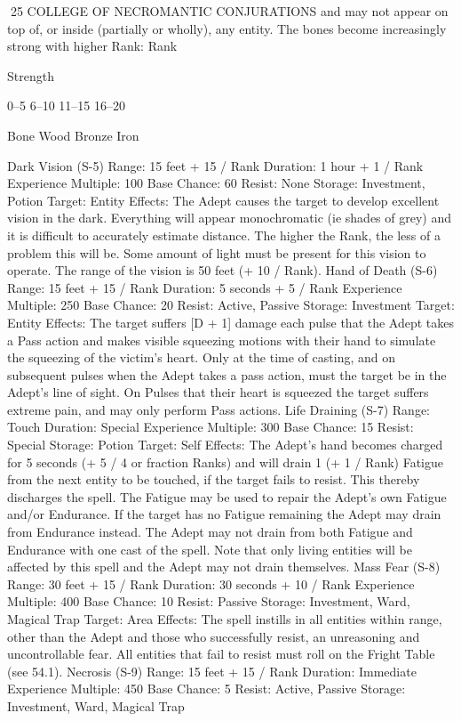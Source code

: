 \documentclass[a4paper]{article}
\begin{document}
\begin{multicols}{3}
25 COLLEGE OF NECROMANTIC CONJURATIONS
and may not appear on top of, or inside (partially
or wholly), any entity. The bones become increasingly strong with higher Rank:
Rank

Strength

0–5
6–10
11–15
16–20

Bone
Wood
Bronze
Iron

Dark Vision (S-5)
Range: 15 feet + 15 / Rank
Duration: 1 hour + 1 / Rank
Experience Multiple: 100
Base Chance: 60%
Resist: None
Storage: Investment, Potion
Target: Entity
Effects: The Adept causes the target to develop
excellent vision in the dark. Everything will appear
monochromatic (ie shades of grey) and it is difficult to accurately estimate distance. The higher the
Rank, the less of a problem this will be. Some
amount of light must be present for this vision to
operate. The range of the vision is 50 feet (+ 10 /
Rank).
Hand of Death (S-6)
Range: 15 feet + 15 / Rank
Duration: 5 seconds + 5 / Rank
Experience Multiple: 250
Base Chance: 20%
Resist: Active, Passive
Storage: Investment
Target: Entity
Effects: The target suffers [D + 1] damage each
pulse that the Adept takes a Pass action and makes
visible squeezing motions with their hand to simulate the squeezing of the victim’s heart. Only at the
time of casting, and on subsequent pulses when the
Adept takes a pass action, must the target be in the
Adept’s line of sight. On Pulses that their heart is
squeezed the target suffers extreme pain, and may
only perform Pass actions.
Life Draining (S-7)
Range: Touch
Duration: Special
Experience Multiple: 300
Base Chance: 15%
Resist: Special
Storage: Potion
Target: Self
Effects: The Adept’s hand becomes charged for 5
seconds (+ 5 / 4 or fraction Ranks) and will drain 1
(+ 1 / Rank) Fatigue from the next entity to be
touched, if the target fails to resist. This thereby
discharges the spell. The Fatigue may be used to
repair the Adept’s own Fatigue and/or Endurance.
If the target has no Fatigue remaining the Adept
may drain from Endurance instead. The Adept may
not drain from both Fatigue and Endurance with
one cast of the spell. Note that only living entities
will be affected by this spell and the Adept may not
drain themselves.
Mass Fear (S-8)
Range: 30 feet + 15 / Rank
Duration: 30 seconds + 10 / Rank
Experience Multiple: 400
Base Chance: 10%
Resist: Passive
Storage: Investment, Ward, Magical Trap
Target: Area
Effects: The spell instills in all entities within
range, other than the Adept and those who successfully resist, an unreasoning and uncontrollable fear.
All entities that fail to resist must roll on the Fright
Table (see 54.1).
Necrosis (S-9)
Range: 15 feet + 15 / Rank
Duration: Immediate
Experience Multiple: 450
Base Chance: 5%
Resist: Active, Passive
Storage: Investment, Ward, Magical Trap


\end{multicols}
\end{document}
